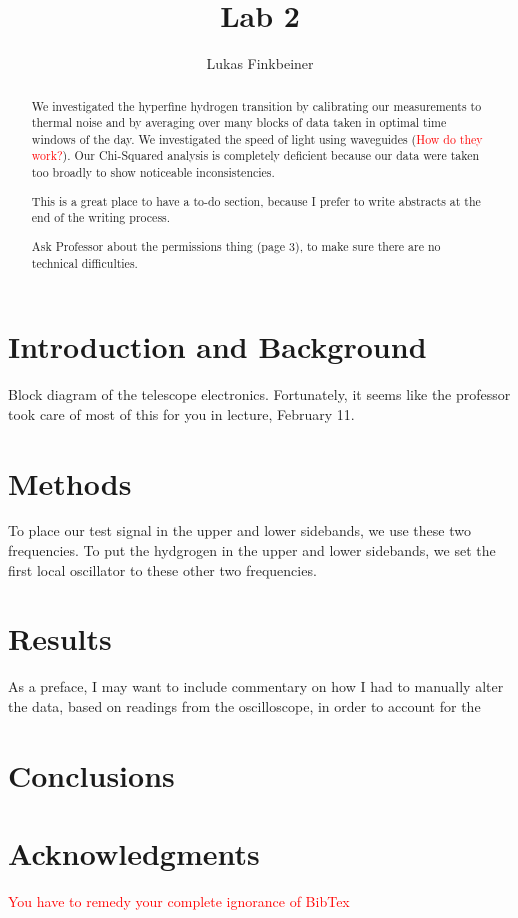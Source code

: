 \documentclass[a4paper]{article}
\title{Lab 2}
\author{Lukas Finkbeiner}
\begin{document}
\maketitle

\begin{abstract}

We investigated the hyperfine hydrogen transition by calibrating our measurements to thermal noise and by averaging over many blocks of data taken in optimal time windows of the day. We investigated the speed of light using waveguides (\textcolor{red}{How do they work?}). Our Chi-Squared analysis is completely deficient because our data were taken too broadly to show noticeable inconsistencies.

This is a great place to have a to-do section, because I prefer to write abstracts at the end of the writing process.

\quad * Ask Professor about the permissions thing (page 3), to make sure there are no technical difficulties.

\end{abstract}


\section{Introduction and Background}

Block diagram of the telescope electronics. Fortunately, it seems like the professor took care of most of this for you in lecture, February 11.

\section{Methods}

To place our test signal in the upper and lower sidebands, we use these two frequencies. To put the hydgrogen in the upper and lower sidebands, we set the first local oscillator to these other two frequencies.

\section{Results}

As a preface, I may want to include commentary on how I had to manually alter the data, based on readings from the oscilloscope, in order to account for the 

\section{Conclusions}

\section{Acknowledgments}

\textcolor{red}{You have to remedy your complete ignorance of BibTex}
\end{document}
